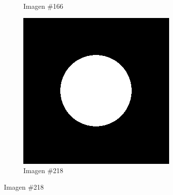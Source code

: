 \begin{figure}
\begin{subfigure}{0.30\textwidth}
		\caption{Imagen \#166}
		\label{f:implementacion:ImSphRad100:166}
	\end{subfigure}
	\begin{subfigure}{0.30\textwidth}
		\centering
		\includegraphics[width=\textwidth]{images/datasets/ImSphRad100/Sphere218.png}
		\caption{Imagen \#218}
		\label{f:implementacion:ImSphRad100:218}
	\end{subfigure}


\end{figure}
